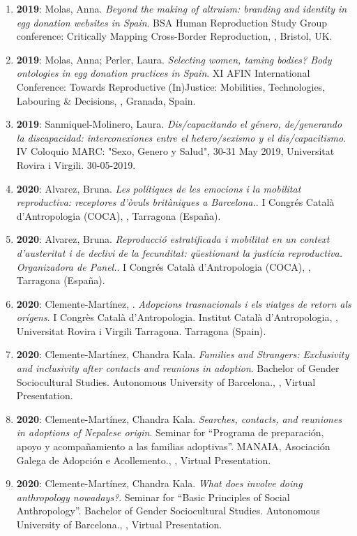 \begin{enumerate}
\item {\bf 2019}: Molas, Anna. {\it Beyond the making of altruism: branding and identity in egg donation websites in Spain}. BSA Human Reproduction Study Group conference: Critically Mapping Cross-Border Reproduction, , Bristol, UK.\filbreak
\item {\bf 2019}: Molas, Anna; Perler, Laura. {\it Selecting women, taming bodies? Body ontologies in egg donation practices in Spain}. XI AFIN International Conference: Towards Reproductive (In)Justice: Mobilities, Technologies, Labouring \& Decisions, , Granada, Spain.\filbreak
\item {\bf 2019}: Sanmiquel-Molinero, Laura. {\it Dis/capacitando el género, de/generando la discapacidad: interconexiones entre el hetero/sexismo y el dis/capacitismo}. IV Coloquio MARC: "Sexo, Genero y Salud", 30-31 May 2019, Universitat Rovira i Virgili. 30-05-2019.\filbreak
\item {\bf 2020}: Alvarez, Bruna. {\it Les polítiques de les emocions i la mobilitat reproductiva: receptores d’òvuls britàniques a Barcelona.}. I Congrés Català d’Antropologia (COCA), , Tarragona (España).\filbreak
\item {\bf 2020}: Alvarez, Bruna. {\it Reproducció estratificada i mobilitat en un context d’austeritat i de declivi de la fecunditat: qüestionant la justícia reproductiva. Organizadora de Panel.}. I Congrés Català d’Antropologia (COCA), , Tarragona (España).\filbreak
\item {\bf 2020}: Clemente-Martínez, . {\it Adopcions trasnacionals i els viatges de retorn als orígens}. I Congrès Català d’Antropologia. Institut Català d’Antropologia, , Universitat Rovira i Virgili Tarragona. Tarragona (Spain).\filbreak
\item {\bf 2020}: Clemente-Martínez, Chandra Kala. {\it Families and Strangers: Exclusivity and inclusivity after contacts and reunions in adoption}. Bachelor of Gender Sociocultural Studies. Autonomous University of Barcelona., , Virtual Presentation.\filbreak
\item {\bf 2020}: Clemente-Martínez, Chandra Kala. {\it Searches, contacts, and reuniones in adoptions of Nepalese origin}. Seminar for “Programa de preparación, apoyo y acompañamiento a las familias adoptivas”. MANAIA, Asociación Galega de Adopción e Acollemento., , Virtual Presentation.\filbreak
\item {\bf 2020}: Clemente-Martínez, Chandra Kala. {\it What does involve doing anthropology nowadays?}. Seminar for “Basic Principles of Social Anthropology”. Bachelor of Gender Sociocultural Studies. Autonomous University of Barcelona., , Virtual Presentation.\filbreak

\end{enumerate}
